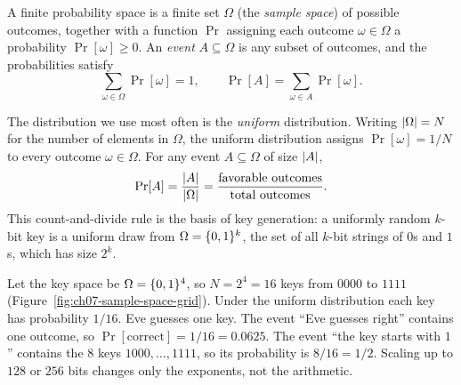 A finite probability space is a finite set $\Omega$ (the \emph{sample space}) of possible outcomes, together with a function $\Pr$ assigning each outcome $\omega \in \Omega$ a probability $\Pr[\omega] \ge 0$. An \emph{event} $A \subseteq \Omega$ is any subset of outcomes, and the probabilities satisfy
\[
  \sum_{\omega \in \Omega} \Pr[\omega] = 1, \qquad \Pr[A] = \sum_{\omega \in A} \Pr[\omega].
\]

The distribution we use most often is the \emph{uniform} distribution. Writing $\lvert\Omega\rvert = N$ for the number of elements in $\Omega$, the uniform distribution assigns $\Pr[\omega] = 1/N$ to every outcome $\omega \in \Omega$. For any event $A \subseteq \Omega$ of size $\lvert A\rvert$,
\[
  \Pr[A] = \frac{\lvert A\rvert}{\lvert\Omega\rvert} = \frac{\text{favorable outcomes}}{\text{total outcomes}}.
\]
This count-and-divide rule is the basis of key generation: a uniformly random $k$-bit key is a uniform draw from $\Omega = \{0,1\}^k$, the set of all $k$-bit strings of $0$s and $1$s, which has size $2^k$.

\begin{example}
\label{ch07:fourbit-key}
Let the key space be $\Omega = \{0,1\}^4$, so $N = 2^4 = 16$ keys from $0000$ to $1111$ (Figure~\ref{fig:ch07-sample-space-grid}). Under the uniform distribution each key has probability $1/16$. Eve guesses one key. The event ``Eve guesses right'' contains one outcome, so $\Pr[\text{correct}] = 1/16 = 0.0625$. The event ``the key starts with $1$'' contains the $8$ keys $1000, \dots, 1111$, so its probability is $8/16 = 1/2$. Scaling up to $128$ or $256$ bits changes only the exponents, not the arithmetic.
\end{example}

